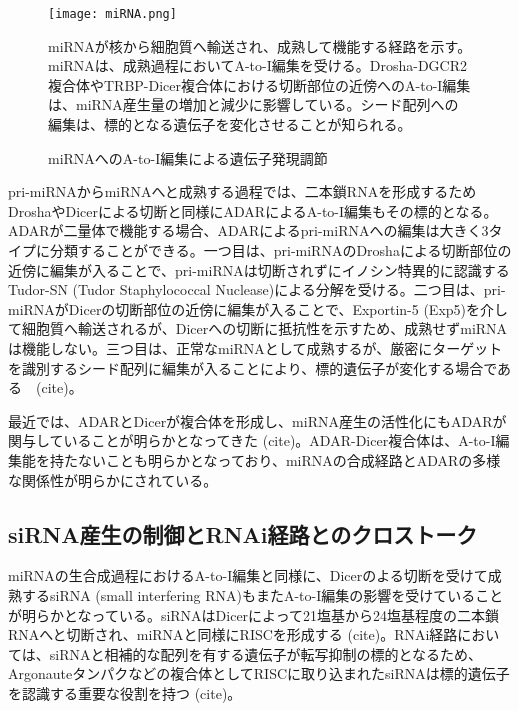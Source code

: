 \begin{figure}[!h]
	\begin{center}
		\texttt{[image: miRNA.png]}
	\end{center}
	\caption{miRNAへのA-to-I編集による遺伝子発現調節}
	\begin{flushleft}
		\small{miRNAが核から細胞質へ輸送され、成熟して機能する経路を示す。miRNAは、成熟過程においてA-to-I編集を受ける。Drosha-DGCR2複合体やTRBP-Dicer複合体における切断部位の近傍へのA-to-I編集は、miRNA産生量の増加と減少に影響している。シード配列への編集は、標的となる遺伝子を変化させることが知られる。}
	\end{flushleft}
	\label{fig:miRNA}
\end{figure}
pri-miRNAからmiRNAへと成熟する過程では、二本鎖RNAを形成するためDroshaやDicerによる切断と同様にADARによるA-to-I編集もその標的となる。ADARが二量体で機能する場合、ADARによるpri-miRNAへの編集は大きく3タイプに分類することができる。一つ目は、pri-miRNAのDroshaによる切断部位の近傍に編集が入ることで、pri-miRNAは切断されずにイノシン特異的に認識するTudor-SN (Tudor Staphylococcal
Nuclease)による分解を受ける。二つ目は、pri-miRNAがDicerの切断部位の近傍に編集が入ることで、Exportin-5 (Exp5)を介して細胞質へ輸送されるが、Dicerへの切断に抵抗性を示すため、成熟せずmiRNAは機能しない。三つ目は、正常なmiRNAとして成熟するが、厳密にターゲットを識別するシード配列に編集が入ることにより、標的遺伝子が変化する場合である　(cite)。
\par
最近では、ADARとDicerが複合体を形成し、miRNA産生の活性化にもADARが関与していることが明らかとなってきた (cite)。ADAR-Dicer複合体は、A-to-I編集能を持たないことも明らかとなっており、miRNAの合成経路とADARの多様な関係性が明らかにされている。

\subsection{siRNA産生の制御とRNAi経路とのクロストーク}
miRNAの生合成過程におけるA-to-I編集と同様に、Dicerのよる切断を受けて成熟するsiRNA (small interfering RNA)もまたA-to-I編集の影響を受けていることが明らかとなっている。siRNAはDicerによって21塩基から24塩基程度の二本鎖RNAへと切断され、miRNAと同様にRISCを形成する (cite)。RNAi経路においては、siRNAと相補的な配列を有する遺伝子が転写抑制の標的となるため、Argonauteタンパクなどの複合体としてRISCに取り込まれたsiRNAは標的遺伝子を認識する重要な役割を持つ (cite)。

